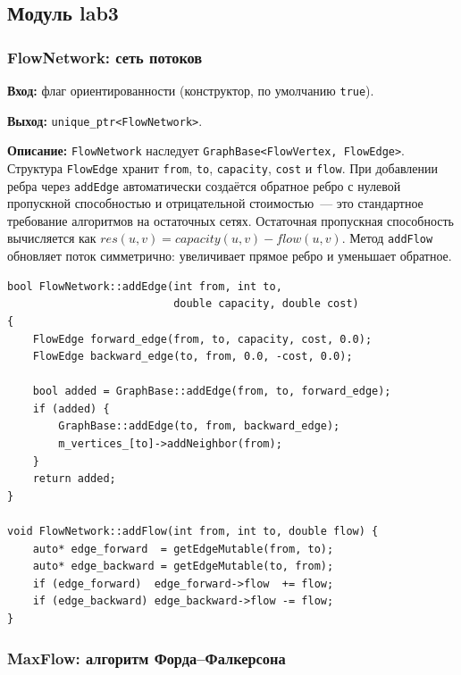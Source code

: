 




\subsection{Модуль lab3}

\subsubsection{FlowNetwork: сеть потоков}

\textbf{Вход:} флаг ориентированности (конструктор, по умолчанию
\texttt{true}).

\textbf{Выход:} \texttt{unique\_ptr<FlowNetwork>}.

\textbf{Описание:} \texttt{FlowNetwork} наследует
\texttt{GraphBase<FlowVertex, FlowEdge>}. Структура \texttt{FlowEdge}
хранит \texttt{from}, \texttt{to}, \texttt{capacity}, \texttt{cost}
и \texttt{flow}. При добавлении ребра через \texttt{addEdge}
автоматически создаётся обратное ребро с нулевой пропускной
способностью и отрицательной стоимостью~--- это стандартное
требование алгоритмов на остаточных сетях.
Остаточная пропускная способность вычисляется как
$\mathit{res}(u,v) = \mathit{capacity}(u,v) - \mathit{flow}(u,v)$.
Метод \texttt{addFlow} обновляет поток симметрично: увеличивает
прямое ребро и уменьшает обратное.

\begin{lstlisting}[style=cppstyle, caption={Добавление ребра и обратного ребра (FlowNetwork.cc)}]
bool FlowNetwork::addEdge(int from, int to,
                          double capacity, double cost)
{
    FlowEdge forward_edge(from, to, capacity, cost, 0.0);
    FlowEdge backward_edge(to, from, 0.0, -cost, 0.0);

    bool added = GraphBase::addEdge(from, to, forward_edge);
    if (added) {
        GraphBase::addEdge(to, from, backward_edge);
        m_vertices_[to]->addNeighbor(from);
    }
    return added;
}

void FlowNetwork::addFlow(int from, int to, double flow) {
    auto* edge_forward  = getEdgeMutable(from, to);
    auto* edge_backward = getEdgeMutable(to, from);
    if (edge_forward)  edge_forward->flow  += flow;
    if (edge_backward) edge_backward->flow -= flow;
}
\end{lstlisting}

\subsubsection{MaxFlow: алгоритм Форда--Фалкерсона}

